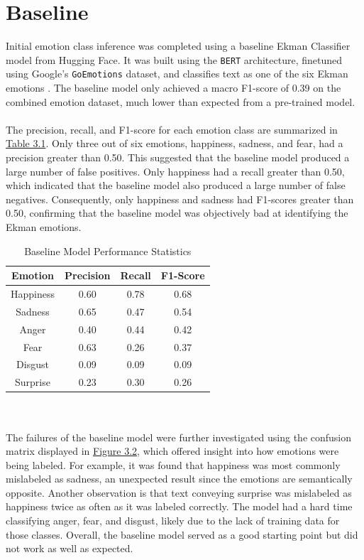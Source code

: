 \documentclass[11pt]{article}
\begin{document}
\section{Baseline}
Initial emotion class inference was completed using a baseline Ekman Classifier model from Hugging Face. It was built using the \texttt{BERT} architecture, finetuned using Google's \texttt{GoEmotions} dataset, and classifies text as one of the six Ekman emotions \cite{Ghoshal, Ghoshal2, demszky2020goemotions}. The baseline model only achieved a macro F1-score of 0.39 on the combined emotion dataset, much lower than expected from a pre-trained model. \\ \\
The precision, recall, and F1-score for each emotion class are summarized in \hyperref[tab:baseline_summary_statistics]{Table 3.1}. Only three out of six emotions, happiness, sadness, and fear, had a precision greater than 0.50. This suggested that the baseline model produced a large number of false positives. Only happiness had a recall greater than 0.50, which indicated that the baseline model also produced a large number of false negatives. Consequently, only happiness and sadness had F1-scores greater than 0.50, confirming that the baseline model was objectively bad at identifying the Ekman emotions.
\renewcommand{\thetable}{3.1}
\begin{table}[h]
    	\centering
    	\begin{tabular}{c c c c}
        		\toprule
        		\textbf{Emotion} & \textbf{Precision} & \textbf{Recall} & \textbf{F1-Score} \\
        		\midrule
        		Happiness & 0.60 & 0.78 & 0.68 \\
        		Sadness & 0.65 & 0.47 & 0.54 \\
        		Anger & 0.40 & 0.44 & 0.42 \\
        		Fear & 0.63 & 0.26 & 0.37 \\
        		Disgust & 0.09 & 0.09 & 0.09 \\
        		Surprise & 0.23 & 0.30 & 0.26 \\
        		\bottomrule
    	\end{tabular}
    	\caption{Baseline Model Performance Statistics}
	\label{tab:baseline_summary_statistics}
\end{table}
\\ \\ The failures of the baseline model were further investigated using the confusion matrix displayed in \hyperref[fig:baseline_confusion_matrix_combined]{Figure 3.2}, which offered insight into how emotions were being labeled. For example, it was found that happiness was most commonly mislabeled as sadness, an unexpected result since the emotions are semantically opposite. Another observation is that text conveying surprise was mislabeled as happiness twice as often as it was labeled correctly. The model had a hard time classifying anger, fear, and disgust, likely due to the lack of training data for those classes. Overall, the baseline model served as a good starting point but did not work as well as expected.
\end{document}
